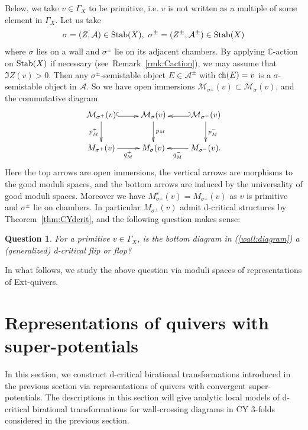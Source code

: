 \documentclass[11pt]{amsart}
\theoremstyle{plain}
\newtheorem{question}[thm]{Question}
\theoremstyle{definition}
\theoremstyle{remark}
\newcommand{\aA}{\mathcal{A}}
\newcommand{\mM}{\mathcal{M}}
\newcommand{\ch}{\mathop{\rm ch}\nolimits}
\newcommand{\Stab}{\mathop{\rm Stab}\nolimits}
\begin{document}
Below, we take $v \in \Gamma_X$ to be primitive, 
i.e. $v$ is not written as a multiple of some element 
in $\Gamma_X$.
Let us take 
\begin{align*}
\sigma=(Z, \aA) \in \Stab(X), \ 
\sigma^{\pm}=(Z^{\pm}, \aA^{\pm}) \in \Stab(X)
\end{align*}
where $\sigma$ lies on a wall and $\sigma^{\pm}$
lie on its adjacent chambers. 
By applying $\mathbb{C}$-action on $\Stab(X)$ if necessary
(see~Remark~\ref{rmk:Caction}),  
we may assume that $\Im Z(v)>0$. 
Then any $\sigma^{\pm}$-semistable object
$E \in \aA^{\pm}$ with $\ch(E)=v$ is
a $\sigma$-semistable object in $\aA$. 
So we have open 
immersions $\mM_{\sigma^{\pm}}(v) \subset \mM_{\sigma}(v)$, 
and the commutative diagram
\begin{align}\label{wall:diagram}
\xymatrix{
\mM_{\sigma^+}(v) \ar@<-0.3ex>@{^{(}->}[r] \ar[d]_{p_M^+} & \mM_{\sigma}(v) 
\ar[d]^-{p_M} & 
\ar@<0.3ex>@{_{(}->}[l] \mM_{\sigma^-}(v) \ar[d]^{p_M^-} \\
M_{\sigma^+}(v) \ar[r]_-{q_M^+} & M_{\sigma}(v) & M_{\sigma^-}(v) 
\ar[l]^-{q_M^-}.
}
\end{align}
Here the top arrows are open immersions, the 
vertical arrows are morphisms to the good moduli 
spaces, and the bottom arrows are induced
by the universality of good moduli spaces. 
Moreover we have
$M_{\sigma^{\pm}}^s(v)=M_{\sigma^{\pm}}(v)$
as $v$ is primitive and $\sigma^{\pm}$ lie on chambers. 
In particular $M_{\sigma^{\pm}}(v)$ 
admit d-critical structures by Theorem~\ref{thm:CYdcrit}, 
and the following question makes sense: 
\begin{question}
For a primitive $v \in \Gamma_X$, is 
the bottom diagram 
in 
(\ref{wall:diagram})
a (generalized) d-critical flip or flop?
\end{question}

In what follows, we study the above question 
via moduli spaces of representations of Ext-quivers. 





\section{Representations of quivers with super-potentials}\label{sec:quiver}
In this section, we construct d-critical birational 
transformations introduced in the previous section
via representations of quivers with convergent super-potentials. 
The descriptions in this section will give 
analytic local models of d-critical birational 
transformations for wall-crossing 
diagrams in CY 3-folds 
considered in the previous section.  
\end{document}
